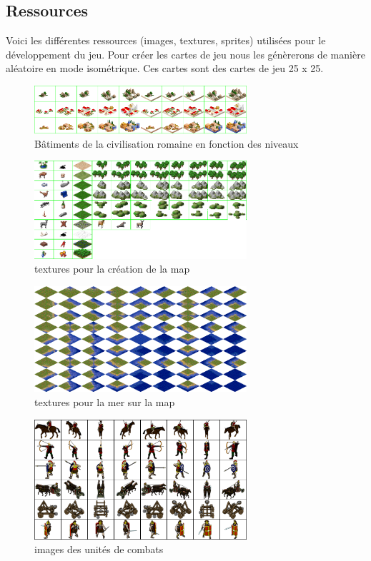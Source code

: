 \documentclass[12pt,a4paper]{article}
\begin{document}
\subsection{Ressources}

Voici les différentes ressources (images, textures, sprites) utilisées pour le développement du jeu. Pour créer les cartes de jeu nous les génèrerons de manière aléatoire en mode isométrique. Ces cartes sont des cartes de jeu 25 x 25.

\begin{figure}[!ht]
    \centering
    \includegraphics[width=0.7\textwidth]{ressources/cities2.png}
     \caption{Bâtiments de la civilisation romaine en fonction des niveaux}
\end{figure}

\begin{figure}[!ht]
    \centering
    \includegraphics[width=0.7\textwidth]{ressources/Terrain.png}
     \caption{textures pour la création de la map}
\end{figure}
\newpage
\begin{figure}[!ht]
    \centering
    \includegraphics[width=0.7\textwidth]{ressources/ocean.png}
     \caption{textures pour la mer sur la map}
\end{figure}

\begin{figure}[!ht]
    \centering
    \includegraphics[width=0.7\textwidth]{ressources/Units.png}
     \caption{images des unités de combats}
\end{figure}
\end{document}
